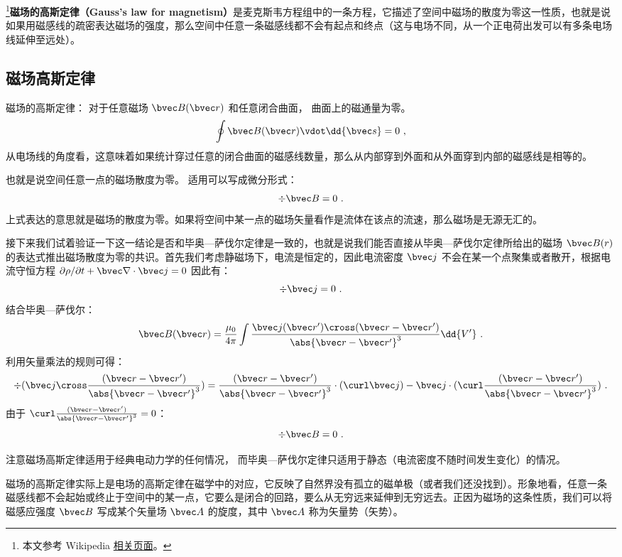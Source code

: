 
\begin{issues}
\issueDraft
\end{issues}


\footnote{本文参考 Wikipedia \href{https://en.wikipedia.org/wiki/Gauss's_law_for_magnetism}{相关页面}。}\textbf{磁场的高斯定律（Gauss's law for magnetism）}是麦克斯韦方程组中的一条方程，它描述了空间中磁场的散度为零这一性质，也就是说如果用磁感线的疏密表达磁场的强度，那么空间中任意一条磁感线都不会有起点和终点（这与电场不同，从一个正电荷出发可以有多条电场线延伸至远处）。

\subsection{磁场高斯定律}
磁场的高斯定律： 对于任意磁场 $\bvec B(\bvec r)$ 和任意闭合曲面， 曲面上的磁通量为零。
\begin{equation}
\oint \bvec B(\bvec r) \vdot \dd{\bvec s} = 0~,
\end{equation}
从电场线的角度看，这意味着如果统计穿过任意的闭合曲面的磁感线数量，那么从内部穿到外面和从外面穿到内部的磁感线是相等的。

也就是说空间任意一点的磁场散度为零。 适用可以写成微分形式：
\begin{equation}
\div\bvec B = 0~.
\end{equation}
上式表达的意思就是磁场的散度为零。如果将空间中某一点的磁场矢量看作是流体在该点的流速，那么磁场是无源无汇的。

接下来我们试着验证一下这一结论是否和毕奥—萨伐尔定律是一致的，也就是说我们能否直接从毕奥—萨伐尔定律所给出的磁场 $\bvec B(r)$ 的表达式推出磁场散度为零的共识。首先我们考虑静磁场下，电流是恒定的，因此电流密度 $\bvec j$ 不会在某一个点聚集或者散开，根据电流守恒方程 $\partial \rho/\partial t + \bvec \nabla\cdot \bvec j=0$ 因此有：
\begin{equation}
\div \bvec j = 0  ~.
\end{equation}
结合毕奥—萨伐尔：
\begin{equation}
\bvec B(\bvec r) = \frac{\mu_0}{4\pi} \int \frac{\bvec j(\bvec r') \cross (\bvec r - \bvec r')}{\abs{\bvec r - \bvec r'}^3} \dd{V'}~.
\end{equation}
利用矢量乘法的规则可得：
\begin{equation}
\div(\bvec j \cross \frac{(\bvec r - \bvec r')}{\abs{\bvec r - \bvec r'}^3})=\frac{(\bvec r - \bvec r')}{\abs{\bvec r - \bvec r'}^3}\cdot(\curl \bvec j)-\bvec j\cdot(\curl \frac{(\bvec r - \bvec r')}{\abs{\bvec r - \bvec r'}^3})~.
\end{equation}
由于 $\curl \frac{(\bvec r - \bvec r')}{\abs{\bvec r - \bvec r'}^3} = 0$：
\begin{equation}
\div \bvec B = 0  ~.
\end{equation}

注意磁场高斯定律适用于经典电动力学的任何情况， 而毕奥—萨伐尔定律只适用于静态（电流密度不随时间发生变化）的情况。

磁场的高斯定律实际上是电场的高斯定律在磁学中的对应，它反映了自然界没有孤立的磁单极（或者我们还没找到）。形象地看，任意一条磁感线都不会起始或终止于空间中的某一点，它要么是闭合的回路，要么从无穷远来延伸到无穷远去。正因为磁场的这条性质，我们可以将磁感应强度 $\bvec B$ 写成某个矢量场 $\bvec A$ 的旋度，其中 $\bvec A$ 称为矢量势（矢势）。
